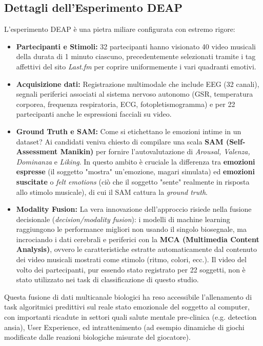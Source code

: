 \subsection{Dettagli dell'Esperimento DEAP}
L'esperimento DEAP è una pietra miliare configurata con estremo rigore:
\begin{itemize}
    \item \textbf{Partecipanti e Stimoli:} 32 partecipanti hanno visionato 40 video musicali della durata di 1 minuto ciascuno, precedentemente selezionati tramite i tag affettivi del sito \textit{Last.fm} per coprire uniformemente i vari quadranti emotivi.
    \item \textbf{Acquisizione dati:} Registrazione multimodale che include EEG (32 canali), segnali periferici associati al sistema nervoso autonomo (GSR, temperatura corporea, frequenza respiratoria, ECG, fotopletismogramma) e per 22 partecipanti anche le espressioni facciali su video.
    \item \textbf{Ground Truth e SAM:} Come si etichettano le emozioni intime in un dataset?
    Ai candidati veniva chiesto di compilare una scala \textbf{SAM (Self-Assessment Manikin)} per fornire l'autovalutazione di \emph{Arousal, Valenza, Dominanza} e \emph{Liking}.
    In questo ambito è cruciale la differenza tra \textbf{emozioni espresse} (il soggetto "mostra" un'emozione, magari simulata) ed \textbf{emozioni suscitate} o \emph{felt emotions} (ciò che il soggetto "sente" realmente in risposta allo stimolo musicale), di cui il SAM cattura la \textit{ground truth}.
    \item \textbf{Modality Fusion:} La vera innovazione dell'approccio risiede nella fusione decisionale (\textit{decision/modality fusion}): i modelli di machine learning raggiungono le performance migliori non usando il singolo biosegnale, ma incrociando i dati cerebrali e periferici con la \textbf{MCA (Multimedia Content Analysis)}, ovvero le caratteristiche estratte automaticamente dal contenuto dei video musicali mostrati come stimolo (ritmo, colori, ecc.). Il video del volto dei partecipanti, pur essendo stato registrato per 22 soggetti, non è stato utilizzato nei task di classificazione di questo studio.
\end{itemize}

Questa fusione di dati multicanale biologici ha reso accessibile l'allenamento di task algoritmici predittivi sul reale stato emozionale del soggetto al computer, con importanti ricadute in settori quali salute mentale pre-clinica (e.g. detection ansia), User Experience, ed intrattenimento (ad esempio dinamiche di giochi modificate dalle reazioni biologiche misurate del giocatore).

